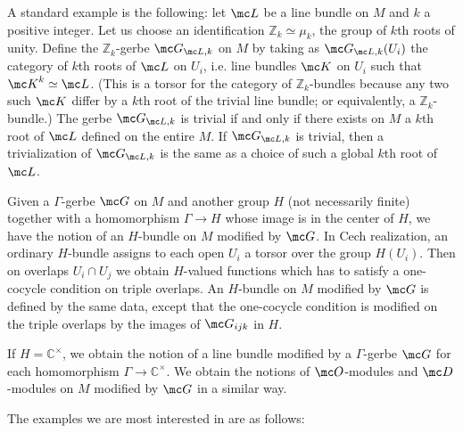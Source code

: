 \documentclass[11pt,reqno]{amsart}
\theoremstyle{plain}
\numberwithin{equation}{section}
\newcommand{\C}{\mathbb{C}}
\newcommand{\Z}{\mathbb{Z}}
\theoremstyle{definition}
\begin{document}
A standard example is the following: let ${\mc L}$ be a line bundle on
$M$ and $k$ a positive integer. Let us choose an identification $\Z_k
\simeq \mu_k$, the group of $k$th roots of unity. Define the
$\Z_k$-gerbe ${\mc G}_{{\mc L},k}$ on $M$ by taking as ${\mc G}_{{\mc
    L},k}(U_i)$ the category of $k$th roots of ${\mc L}$ on $U_i$,
i.e. line bundles ${\mc K}$ on $U_i$ such that ${\mc K}^k \simeq {\mc
  L}$. (This is a torsor for the category of $\Z_k$-bundles because
any two such ${\mc K}$ differ by a $k$th root of the trivial line
bundle; or equivalently, a $\Z_k$-bundle.) The gerbe ${\mc G}_{{\mc
    L},k}$ is trivial if and only if there exists on $M$ a $k$th root
of ${\mc L}$ defined on the entire $M$. If ${\mc G}_{{\mc L},k}$ is
trivial, then a trivialization of ${\mc G}_{{\mc L},k}$ is the same as
a choice of such a global $k$th root of ${\mc L}$.

Given a $\Gamma$-gerbe ${\mc G}$ on $M$ and another group $H$ (not
necessarily finite) together with a homomorphism $\Gamma \to H$ whose
image is in the center of $H$, we have the notion of an $H$-bundle
on $M$ modified by ${\mc G}$. In Cech realization, an ordinary
$H$-bundle assigns to each open $U_i$ a torsor over the group
$H(U_i)$. Then on overlaps $U_i \cap U_j$ we obtain $H$-valued
functions which has to satisfy a one-cocycle condition on triple
overlaps. An $H$-bundle on $M$ modified by ${\mc G}$ is defined by the
same data, except that the one-cocycle condition is modified on the
triple overlaps by the images of ${\mc G}_{ijk}$ in $H$.

If $H=\C^\times$, we obtain the notion of a line bundle modified by a
$\Gamma$-gerbe ${\mc G}$ for each homomorphism $\Gamma \to
\C^\times$. We obtain the notions of ${\mc O}$-modules and ${\mc
  D}$-modules on $M$ modified by ${\mc G}$ in a similar way.

The examples we are most interested in are as follows:

\medskip
\end{document}
